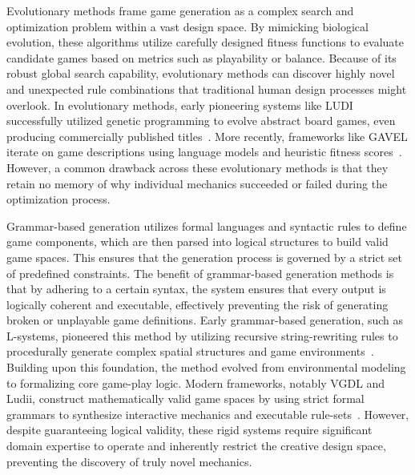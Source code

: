 \documentclass[conference]{IEEEtran}
\begin{document}
Evolutionary methods frame game generation as a complex search and optimization problem within a vast design space. By mimicking biological evolution, these algorithms utilize carefully designed fitness functions to evaluate candidate games based on metrics such as playability or balance. Because of its robust global search capability, evolutionary methods can discover highly novel and unexpected rule combinations that traditional human design processes might overlook. In evolutionary methods, early pioneering systems like LUDI successfully utilized genetic programming to evolve abstract board games, even producing commercially published titles~\cite{browne2010evolutionary}. More recently, frameworks like GAVEL iterate on game descriptions using language models and heuristic fitness scores~\cite{todd2024gavel}. However, a common drawback across these evolutionary methods is that they retain no memory of why individual mechanics succeeded or failed during the optimization process.

Grammar-based generation utilizes formal languages and syntactic rules to define game components, which are then parsed into logical structures to build valid game spaces. This ensures that the generation process is governed by a strict set of predefined constraints. The benefit of grammar-based generation methods is that by adhering to a certain syntax, the system ensures that every output is logically coherent and executable, effectively preventing the risk of generating broken or unplayable game definitions. Early grammar-based generation, such as L-systems, pioneered this method by utilizing recursive string-rewriting rules to procedurally generate complex spatial structures and game environments~\cite{lindenmayer1968mathematical}. Building upon this foundation, the method evolved from environmental modeling to formalizing core game-play logic. Modern frameworks, notably VGDL and Ludii, construct mathematically valid game spaces by using strict formal grammars to synthesize interactive mechanics and executable rule-sets~\cite{piette2019ludii,schaul2013video}. However, despite guaranteeing logical validity, these rigid systems require significant domain expertise to operate and inherently restrict the creative design space, preventing the discovery of truly novel mechanics.
\end{document}

